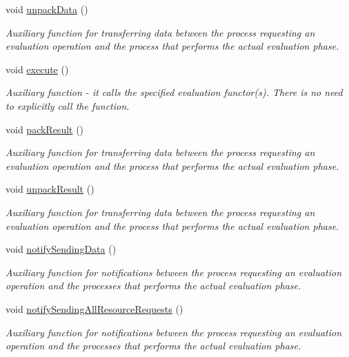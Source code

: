 \begin{CompactItemize}
void \hyperlink{classpeoPopEval_cb256d94000a47af06d3e8a3f7ab0eff}{unpack\-Data} ()
\begin{CompactList}\small\item\em Auxiliary function for transferring data between the process requesting an evaluation operation and the process that performs the actual evaluation phase. \item\end{CompactList}\item 
\hypertarget{classpeoPopEval_05a85a265971d4b12f2f0014d33f705c}{
void \hyperlink{classpeoPopEval_05a85a265971d4b12f2f0014d33f705c}{execute} ()}
\label{classpeoPopEval_05a85a265971d4b12f2f0014d33f705c}

\begin{CompactList}\small\item\em Auxiliary function - it calls the specified evaluation functor(s). There is no need to explicitly call the function. \item\end{CompactList}\item 
void \hyperlink{classpeoPopEval_9d0d10865d677c1ec84f496bed62a8c6}{pack\-Result} ()
\begin{CompactList}\small\item\em Auxiliary function for transferring data between the process requesting an evaluation operation and the process that performs the actual evaluation phase. \item\end{CompactList}\item 
void \hyperlink{classpeoPopEval_f64aa1322e8e26f39143e1a6395206b6}{unpack\-Result} ()
\begin{CompactList}\small\item\em Auxiliary function for transferring data between the process requesting an evaluation operation and the process that performs the actual evaluation phase. \item\end{CompactList}\item 
void \hyperlink{classpeoPopEval_9708f67fc813d397de3d13830ed09820}{notify\-Sending\-Data} ()
\begin{CompactList}\small\item\em Auxiliary function for notifications between the process requesting an evaluation operation and the processes that performs the actual evaluation phase. \item\end{CompactList}\item 
void \hyperlink{classpeoPopEval_b1e33394ba9797237cb8c7c1f410bd67}{notify\-Sending\-All\-Resource\-Requests} ()
\begin{CompactList}\small\item\em Auxiliary function for notifications between the process requesting an evaluation operation and the processes that performs the actual evaluation phase. \item\end{CompactList}\end{CompactItemize}
